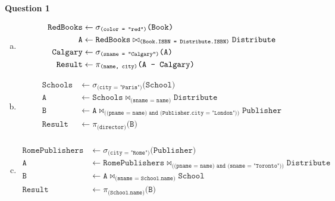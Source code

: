 \documentclass[11pt]{article}
\def\code#1{\texttt{#1}}
\def\select#1#2{\sigma_{\code{(#1)}} \code{(#2)}}
\def\join#1#2#3{\code{#1} \bowtie_{\code{(#2)}} \code{#3}}
\def\proj#1#2{\pi_{\code{(#1)}} \code{(#2)}}
\def\diff#1#2{\code{#1} - \code{#2}}
\begin{document}
\item[] \textbf{Question 1}

  \begin{enumerate}[a.]
    \item
      \begin{equation*}
      \begin{aligned}
        \code{RedBooks} &\leftarrow \select{color = "red"}{Book} \\
        \code{A} &\leftarrow \join{RedBooks}{Book.ISBN = Distribute.ISBN}{Distribute} \\
        \code{Calgary} &\leftarrow \select{sname = "Calgary"}{A} \\
        \code{Result} &\leftarrow \proj{name, city} {\diff{A}{Calgary}}
      \end{aligned}
      \end{equation*}

    \item
      \begin{equation*}
      \begin{aligned}
        \code{Schools} &\leftarrow \select{city = "Paris"}{School} \\
        \code{A} &\leftarrow \join{Schools}{sname = name}{Distribute} \\
        \code{B} &\leftarrow \join{A}{(pname = name) and (Publisher.city = "London")}{Publisher} \\
        \code{Result} &\leftarrow \proj{director}{B} \\
      \end{aligned}
      \end{equation*}

    \item 
      \begin{equation*}
      \begin{aligned}
        \code{RomePublishers} &\leftarrow \select{city = "Rome"}{Publisher} \\
        \code{A} &\leftarrow \join{RomePublishers}{(pname = name) and (sname = "Toronto")}{Distribute} \\ %
        \code{B} &\leftarrow \join{A}{sname = School.name}{School} \\ %
        \code{Result} &\leftarrow \proj{School.name}{B}
      \end{aligned}
      \end{equation*}


\end{enumerate}
\end{document}
